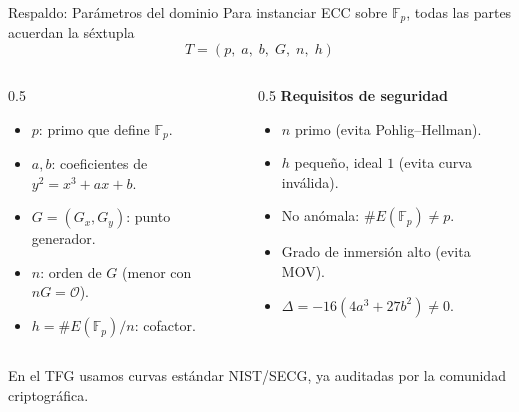 \documentclass[aspectratio=169,11pt]{beamer}
\begin{document}
\begin{frame}[noframenumbering]{Respaldo: Parámetros del dominio}
  \small
  Para instanciar ECC sobre $\mathbb{F}_p$, todas las partes acuerdan la séxtupla
  \[ T = (p,\; a,\; b,\; G,\; n,\; h) \]
  \begin{columns}[t]
    \begin{column}{0.5\textwidth}
      \begin{itemize}\footnotesize
        \item $p$: primo que define $\mathbb{F}_p$.
        \item $a,b$: coeficientes de $y^2=x^3+ax+b$.
        \item $G=(G_x,G_y)$: punto generador.
        \item $n$: orden de $G$ (menor con $nG=\mathcal{O}$).
        \item $h = \#E(\mathbb{F}_p)/n$: cofactor.
      \end{itemize}
    \end{column}
    \begin{column}{0.5\textwidth}
      \textbf{Requisitos de seguridad}
      \begin{itemize}\footnotesize
        \item $n$ primo (evita Pohlig--Hellman).
        \item $h$ pequeño, ideal $1$ (evita curva inválida).
        \item No anómala: $\#E(\mathbb{F}_p)\neq p$.
        \item Grado de inmersión alto (evita MOV).
        \item $\Delta = -16(4a^3+27b^2)\neq 0$.
      \end{itemize}
    \end{column}
  \end{columns}
  \vspace{0.5ex}
  \footnotesize En el TFG usamos curvas estándar \alert{NIST/SECG}, ya auditadas por la
  comunidad criptográfica.
\end{frame}
\end{document}
